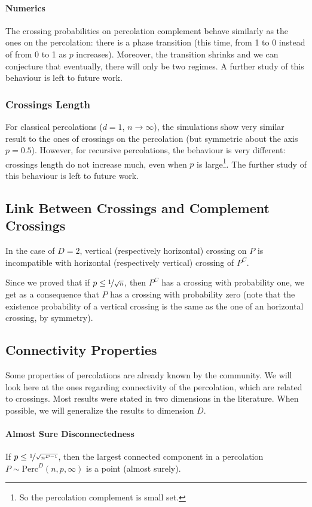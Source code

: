 \paragraph{Numerics}
The crossing probabilities on percolation complement behave similarly as the ones on the percolation: there is a phase transition (this time, from 1 to 0 instead of from 0 to 1 as $p$ increases).
Moreover, the transition shrinks and we can conjecture that eventually, there will only be two regimes.
A further study of this behaviour is left to future work.

\subsubsection{Crossings Length}
For classical percolations ($d=1$, $n \to \infty$), the simulations show very similar result to the ones of crossings on the percolation (but symmetric about the axis $p=0.5$).
However, for recursive percolations, the behaviour is very different: crossings length do not increase much, even when $p$ is large\footnote{So the percolation complement is small set.}.
The further study of this behaviour is left to future work.

\subsection{Link Between Crossings and Complement Crossings}
In the case of $D=2$, vertical (respectively horizontal) crossing on $P$ is incompatible with horizontal (respectively vertical) crossing of $P^C$.

Since we proved that if $p \leq \nicefrac{1}{\sqrt{n}}$, then $P^C$ has a crossing with probability one, we get as a consequence that $P$ has a crossing with probability zero (note that the existence probability of a vertical crossing is the same as the one of an horizontal crossing, by symmetry).

\subsection{Connectivity Properties}
Some properties of percolations are already known by the community.
We will look here at the ones regarding connectivity of the percolation, which are related to crossings.
Most results were stated in two dimensions in the literature.
When possible, we will generalize the results to dimension $D$.

\paragraph{Almost Sure Disconnectedness}
If $p \leq \nicefrac{1}{\sqrt{n^{D-1}}}$, then the largest connected component in a percolation $P \sim \text{Perc}^D(n,p,\infty)$ is a point (almost surely).

